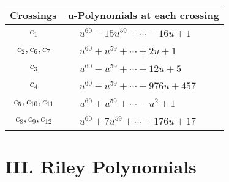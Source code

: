 \documentclass[1p]{elsarticle_modified}
\theoremstyle{definition}
\begin{document}
\begin{tabular}{m{50pt}|m{274pt}}
Crossings & \hspace{64pt}u-Polynomials at each crossing \\
\hline $$\begin{aligned}c_{1}\end{aligned}$$&$\begin{aligned}
&u^{60}-15 u^{59}+\cdots-16 u+1
\end{aligned}$\\
\hline $$\begin{aligned}c_{2},c_{6},c_{7}\end{aligned}$$&$\begin{aligned}
&u^{60}+u^{59}+\cdots+2 u+1
\end{aligned}$\\
\hline $$\begin{aligned}c_{3}\end{aligned}$$&$\begin{aligned}
&u^{60}- u^{59}+\cdots+12 u+5
\end{aligned}$\\
\hline $$\begin{aligned}c_{4}\end{aligned}$$&$\begin{aligned}
&u^{60}- u^{59}+\cdots-976 u+457
\end{aligned}$\\
\hline $$\begin{aligned}c_{5},c_{10},c_{11}\end{aligned}$$&$\begin{aligned}
&u^{60}+u^{59}+\cdots- u^2+1
\end{aligned}$\\
\hline $$\begin{aligned}c_{8},c_{9},c_{12}\end{aligned}$$&$\begin{aligned}
&u^{60}+7 u^{59}+\cdots+176 u+17
\end{aligned}$\\
\hline
\end{tabular}\newpage\renewcommand{\arraystretch}{1}
\centering \section*{ III. Riley Polynomials}
\end{document}
